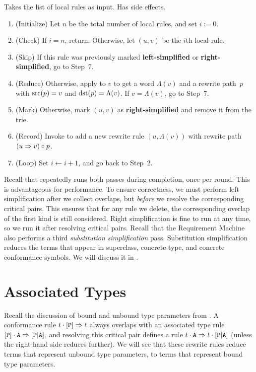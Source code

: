 \documentclass[../generics]{subfiles}
\begin{document}
\begin{algorithm}\label{alg:simplify right}
Takes the list of local rules as input. Has side effects.
\begin{enumerate}
\item (Initialize) Let $n$ be the total number of local rules, and set $i:=0$.
\item (Check) If $i=n$, return. Otherwise, let $(u, v)$ be the $i$th local rule.
\item (Skip) If this rule was previously marked \textbf{left-simplified} or \textbf{right-simplified}, go to Step~7.
\item (Reduce) Otherwise, apply  to $v$ to get a word $\Lambda(v)$ and a rewrite path~$p$ with $\operatorname{src}(p)=v$ and $\operatorname{dst}(p)=\Lambda(v)$. If $v=\Lambda(v)$, go to Step~7.
\item (Mark) Otherwise, mark $(u, v)$ as \textbf{right-simplified} and remove it from the trie.
\item (Record) Invoke  to add a new rewrite rule $(u, \Lambda(v))$ with rewrite path $(u \Rightarrow v) \circ p$.
\item (Loop) Set $i \leftarrow i + 1$, and go back to Step~2.
\end{enumerate}
\end{algorithm}

Recall that  repeatedly runs both passes during completion, once per round. This is advantageous for performance. To ensure correctness, we must perform left simplification after we collect overlaps, but \emph{before} we resolve the corresponding critical pairs. This ensures that for any rule we delete, the corresponding overlap of the first kind is still considered. Right simplification is fine to run at any time, so we run it after resolving critical pairs. Recall that the Requirement Machine also performs a third \emph{substitution simplification} pass. Substitution simplification reduces the terms that appear in superclass, concrete type, and concrete conformance symbols. We will discuss it in .

\section{Associated Types}\label{sec:associated types}

Recall the discussion of bound and unbound type parameters from . A conformance rule $t\cdot[\texttt{P}]\Rightarrow t$ always overlaps with an associated type rule $[\texttt{P}]\cdot\texttt{A}\Rightarrow[\texttt{P}|\texttt{A}]$, and resolving this critical pair defines a rule $t\cdot\texttt{A} \Rightarrow t\cdot[\texttt{P}|\texttt{A}]$ (unless the right-hand side reduces further). We will see that these rewrite rules reduce terms that represent unbound type parameters, to terms that represent bound type parameters.
\end{document}
